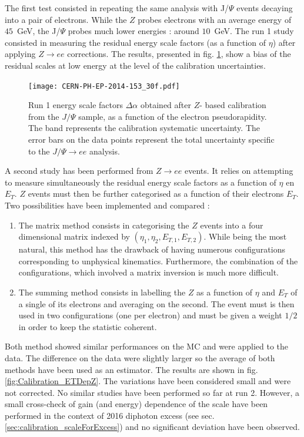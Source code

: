 The first test consisted in repeating the same analysis with J/$\Psi$ events decaying into a pair of electrons.
While the $Z$ probes electrons with an average energy of $45$~GeV, the J/$\Psi$ probes much lower energies : around $10$~GeV.
The run 1 study consisted in measuring the residual energy scale factors (as a function of $\eta$) after applying $Z\rightarrow ee$ corrections.
The results, presented in fig. \ref{fig:Calibration_JPsiCheck}, show a bias of the residual scales at low energy at the level of the calibration uncertainties.

\begin{figure}[htbp]
\centering
\texttt{[image: CERN-PH-EP-2014-153\_30f.pdf]}
\caption{\label{fig:Calibration_JPsiCheck}
  Run 1 energy scale factors $\Delta\alpha$ obtained after $Z$- based
  calibration from the $J/\Psi$ sample, as a function of the electron
  pseudorapidity. The band represents the calibration systematic uncertainty. The error bars on the data points represent
  the total uncertainty specific to the $J/\Psi\rightarrow ee$ analysis.
  \cite{CERN-PH-EP-2014-153}}
\end{figure}

A second study has been performed from $Z\rightarrow ee$ events.
It relies on attempting to measure simultaneously the residual energy scale factors as a function of $\eta$ en $E_T$.
$Z$ events must then be further categorised as a function of their electrons $E_T$.
Two possibilities have been implemented and compared :
\begin{enumerate}
\item The matrix method consists in categorising the $Z$ events into a four dimensional matrix indexed by $(\eta_1, \eta_2, E_{T,1}, E_{T,2})$.
  While being the most natural, this method has the drawback of having numerous configurations corresponding to unphysical kinematics.
  Furthermore, the combination of the configurations, which involved a matrix inversion is much more difficult.

\item The summing method consists in labelling the $Z$ as a function of $\eta$ and $E_T$ of a single of its electrons and averaging on the second.
  The event must is then used in two configurations (one per electron) and must be given a weight $1/2$ in order to keep the statistic coherent.
\end{enumerate}
Both method showed similar performances on the MC and were applied to the data.
The difference on the data were slightly larger so the average of both methods have been used as an estimator.
The results are shown in fig. \ref{fig:Calibration_ETDepZ}.
The variations have been considered small and were not corrected.
No similar studies have been performed so far at run 2.
However, a small cross-check of gain (and energy) dependence of the scale have been performed in the context of 2016 diphoton excess (see sec. \ref{sec:calibration_scaleForExcess}) and no significant deviation have been observed.

